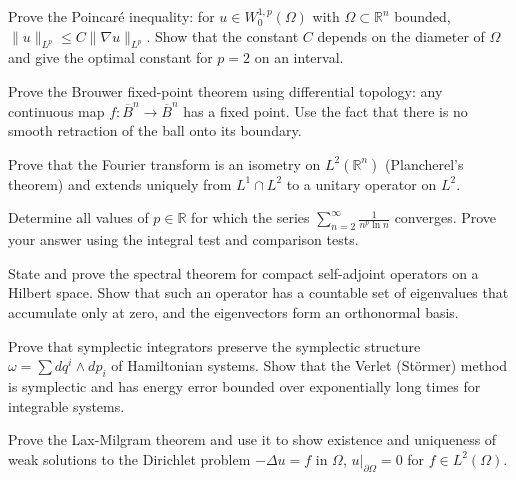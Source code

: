 \documentclass[12pt,a4paper]{exam}
\begin{document}
\begin{questions}
\vspace{0.3cm}

\question[3]
Prove the Poincar\'e inequality: for $u \in W_0^{1,p}(\Omega)$ with $\Omega \subset \mathbb{R}^n$ bounded, $\|u\|_{L^p} \leq C \|\nabla u\|_{L^p}$. Show that the constant $C$ depends on the diameter of $\Omega$ and give the optimal constant for $p=2$ on an interval.

\vspace{0.3cm}

\question[2]
Prove the Brouwer fixed-point theorem using differential topology: any continuous map $f: \overline{B}^n \to \overline{B}^n$ has a fixed point. Use the fact that there is no smooth retraction of the ball onto its boundary.

\vspace{0.3cm}

\question[2]
Prove that the Fourier transform is an isometry on $L^2(\mathbb{R}^n)$ (Plancherel's theorem) and extends uniquely from $L^1 \cap L^2$ to a unitary operator on $L^2$.

\vspace{0.3cm}

\question[6]
Determine all values of $p \in \mathbb{R}$ for which the series $\sum_{n=2}^{\infty} \frac{1}{n^p \ln n}$ converges. Prove your answer using the integral test and comparison tests.

\vspace{0.3cm}

\question[7]
State and prove the spectral theorem for compact self-adjoint operators on a Hilbert space. Show that such an operator has a countable set of eigenvalues that accumulate only at zero, and the eigenvectors form an orthonormal basis.

\vspace{0.3cm}

\question[2]
Prove that symplectic integrators preserve the symplectic structure $\omega = \sum dq^i \wedge dp_i$ of Hamiltonian systems. Show that the Verlet (St\"ormer) method is symplectic and has energy error bounded over exponentially long times for integrable systems.

\vspace{0.3cm}

\question[2]
Prove the Lax-Milgram theorem and use it to show existence and uniqueness of weak solutions to the Dirichlet problem $-\Delta u = f$ in $\Omega$, $u|_{\partial\Omega} = 0$ for $f \in L^2(\Omega)$.

\vspace{0.3cm}


\end{questions}
\end{document}
